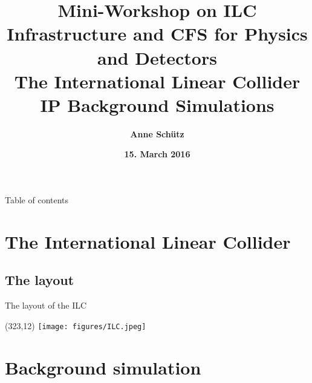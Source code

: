 \documentclass[xcolor={dvipsnames}]{beamer}
\title[ILC \& Background Simulations]{\textbf{\alert{Mini-Workshop on ILC Infrastructure and CFS for Physics and Detectors} \\\LARGE The International Linear Collider \\ \normalsize IP Background Simulations}}
\author{\textbf{Anne Sch\"utz}}
\institute{\textbf{KIT, DESY}}
\date{\textbf{15. March 2016}}
\newcommand{\ilclogo}{
  \setlength{\TPHorizModule}{1pt}
  \setlength{\TPVertModule}{1pt}
  \begin{textblock}{1}(323,12)
   \texttt{[image: figures/ILC.jpeg]}
  \end{textblock}
}
\begin{document}
{
\begin{frame}
  \titlepage
\end{frame}
}

\begin{frame}{Table of contents}
  \tableofcontents
\end{frame}


\section{The International Linear Collider}

\subsection{The layout}
\begin{frame}{The layout of the ILC}
\ilclogo
\begin{center}
\end{center}
\end{frame}

\section{Background simulation}
\end{document}
